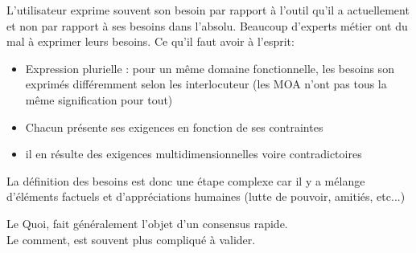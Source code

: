 \documentclass[11pt,a4paper]{article}
\begin{document}
	L'utilisateur exprime souvent son besoin par rapport à l'outil qu'il a actuellement et non par rapport à ses besoins dans l'absolu. Beaucoup d'experts métier ont du mal à exprimer leurs besoins.
	Ce qu'il faut avoir à l'esprit:
	\begin{itemize}
		\item Expression plurielle : pour un même domaine fonctionnelle, les besoins son exprimés différemment selon les interlocuteur (les MOA n'ont pas tous la même signification pour tout)
		\item Chacun présente ses exigences en fonction de ses contraintes
		\item il en résulte des exigences multidimensionnelles voire contradictoires
	\end{itemize}

	La définition des besoins est donc une étape complexe car il y a mélange d'éléments factuels et d'appréciations humaines (lutte de pouvoir, amitiés, etc...)
	
	Le Quoi, fait généralement l'objet d'un consensus rapide.\\
	Le comment, est souvent plus compliqué à valider.
	
\end{document}
